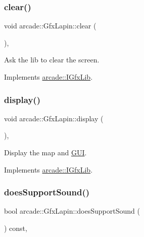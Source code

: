 \subsubsection{\texorpdfstring{clear()}{clear()}}
{\footnotesize\ttfamily void arcade\+::\+Gfx\+Lapin\+::clear (\begin{DoxyParamCaption}{ }\end{DoxyParamCaption})\hspace{0.3cm}{\ttfamily [override]}, {\ttfamily [virtual]}}



Ask the lib to clear the screen. 



Implements \hyperlink{classarcade_1_1_i_gfx_lib_a4116b3d4f503c4a795539b584f77a73d}{arcade\+::\+I\+Gfx\+Lib}.

\mbox{\label{classarcade_1_1_gfx_lapin_ac7c96886eb54a7d2f18e528e8f0c7ba1}} 
\subsubsection{\texorpdfstring{display()}{display()}}
{\footnotesize\ttfamily void arcade\+::\+Gfx\+Lapin\+::display (\begin{DoxyParamCaption}{ }\end{DoxyParamCaption})\hspace{0.3cm}{\ttfamily [override]}, {\ttfamily [virtual]}}



Display the map and \hyperlink{classarcade_1_1_g_u_i}{G\+UI}. 



Implements \hyperlink{classarcade_1_1_i_gfx_lib_a7f280525c718a44c1e05cfe0ba5304c3}{arcade\+::\+I\+Gfx\+Lib}.

\mbox{\label{classarcade_1_1_gfx_lapin_ae84337d3ae5e24a61f160d3ac99d4e10}} 
\subsubsection{\texorpdfstring{does\+Support\+Sound()}{doesSupportSound()}}
{\footnotesize\ttfamily bool arcade\+::\+Gfx\+Lapin\+::does\+Support\+Sound (\begin{DoxyParamCaption}{ }\end{DoxyParamCaption}) const\hspace{0.3cm}{\ttfamily [override]}, {\ttfamily [virtual]}}



